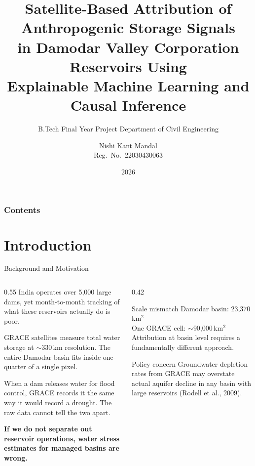 \documentclass[10pt]{beamer}
\title[DVC Reservoir Attribution]{%
  Satellite-Based Attribution of Anthropogenic Storage Signals\\
  in Damodar Valley Corporation Reservoirs Using\\
  Explainable Machine Learning and Causal Inference}
\subtitle{B.Tech Final Year Project\;\textbar\;%
  Department of Civil Engineering}
\author[Nishi Kant Mandal]{Nishi Kant Mandal\\[4pt]
  {\small Reg.\ No.\ 22030430063}}
\institute[BIT Sindri]{%
  Supervisor: Dr.\ Maya Rajnarayan Ray\\
  Associate Professor, Civil Engineering\\[2pt]
  Birsa Institute of Technology, Sindri, Dhanbad}
\date[2026]{2026}
\begin{document}
\frame{\titlepage}
\begin{frame}
\frametitle{Contents}
\tableofcontents
\end{frame}


\section{Introduction}

\begin{frame}{Background and Motivation}
  \begin{columns}[T]
    \begin{column}{0.55\textwidth}
      \small
      India operates over 5,000 large dams, yet month-to-month
      tracking of what these reservoirs actually do is poor.

      \medskip
      GRACE satellites measure total water storage at
      $\sim$330\,km resolution. The entire Damodar basin
      fits inside one-quarter of a single pixel.

      \medskip
      When a dam releases water for flood control, GRACE
      records it the same way it would record a drought.
      The raw data cannot tell the two apart.

      \medskip
      \textbf{If we do not separate out reservoir operations,
      water stress estimates for managed basins are wrong.}
    \end{column}
    \begin{column}{0.42\textwidth}
      \begin{block}{Scale mismatch}
        \footnotesize
        Damodar basin: 23,370\,km$^2$\\
        One GRACE cell: $\sim$90,000\,km$^2$\\[4pt]
        Attribution at basin level requires
        a fundamentally different approach.
      \end{block}
      \vspace{4pt}
      \begin{alertblock}{Policy concern}
        \footnotesize
        Groundwater depletion rates from GRACE
        may overstate actual aquifer decline in
        any basin with large reservoirs
        (Rodell et al., 2009).
      \end{alertblock}
    \end{column}
  \end{columns}
\end{frame}
\end{document}
